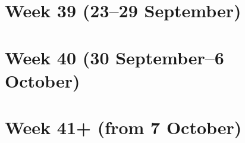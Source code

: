 \documentclass{article}
\begin{document}
\section{Week 39 (23--29 September)}

\section{Week 40 (30 September--6 October)}

\section{Week 41+ (from 7 October)}
\end{document}
